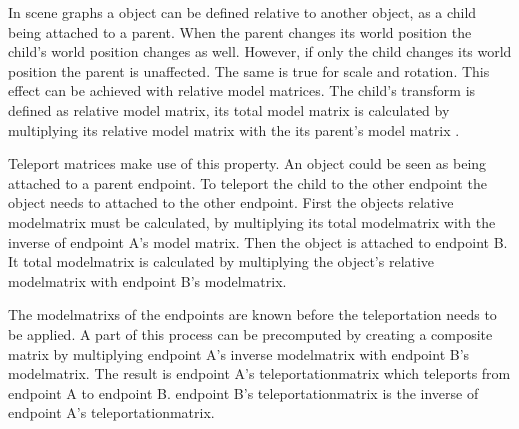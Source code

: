 In scene graphs a object can be defined relative to another object, as a child being attached to a parent. When the parent changes its world position the child's world position changes as well. However, if only the child changes its world position the parent is unaffected. The same is true for scale and rotation. This effect can be achieved with relative model matrices. The child's transform is defined as relative model matrix, its total model matrix is calculated by multiplying its relative model matrix with the its parent's model matrix \cite{akine:2018:realtime}.

Teleport matrices make use of this property. An object could be seen as being attached to a parent \gls{endpoint}. To teleport the child to the other endpoint the object needs to attached to the other endpoint. First the objects relative \gls{modelmatrix} must be calculated, by multiplying its total \gls{modelmatrix} with the inverse of \gls{endpoint} A's model matrix. Then the object is attached to \gls{endpoint} B. It total \gls{modelmatrix} is calculated by multiplying the object's relative \gls{modelmatrix} with \gls{endpoint} B's \gls{modelmatrix}.

The \glspl{modelmatrix} of the endpoints are known before the teleportation needs to be applied. A part of this process can be precomputed by creating a composite matrix by multiplying \gls{endpoint} A's inverse \gls{modelmatrix} with \gls{endpoint} B's \gls{modelmatrix}. The result is \gls{endpoint} A's \gls{teleportationmatrix} which teleports from \gls{endpoint} A to \gls{endpoint} B. \Gls{endpoint} B's \gls{teleportationmatrix} is the inverse of \gls{endpoint} A's \gls{teleportationmatrix}.







